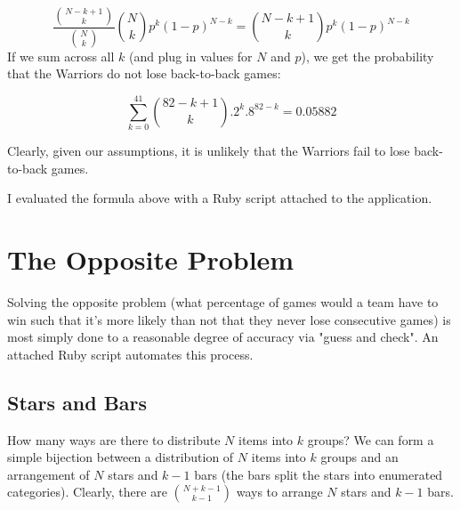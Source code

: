 \documentclass{article}
\begin{document}
\[ \frac{\binom{N-k+1}{k}}{\binom{N}{k}} \binom{N}{k} p^k (1-p)^{N-k} = \binom{N-k+1}{k} p^k (1-p)^{N-k}\]
If we sum across all $k$ (and plug in values for $N$ and $p$), we get the probability that the Warriors do not lose back-to-back games:

\[ \sum \limits_{k = 0}^{41} \binom{82-k+1}{k} .2^k .8^{82-k} = 0.05882\]

Clearly, given our assumptions, it is unlikely that the Warriors fail to lose back-to-back games.

I evaluated the formula above with a Ruby script attached to the application.

\section*{The Opposite Problem}

Solving the opposite problem (what percentage of games would a team have to win such that it's more likely than not that they never lose consecutive games) is most simply done to a reasonable degree of accuracy via "guess and check". An attached Ruby script automates this process.

\subsection*{Stars and Bars}
How many ways are there to distribute $N$ items into $k$ groups? We can form a simple bijection between a distribution of $N$ items into $k$ groups and an arrangement of $N$ stars and $k-1$ bars (the bars split the stars into enumerated categories). Clearly, there are $\binom{N+k-1}{k-1}$ ways to arrange $N$ stars and $k-1$ bars.
\end{document}
